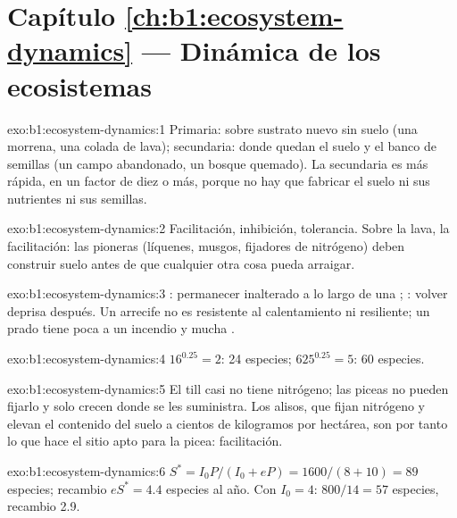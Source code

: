 \section*{Capítulo \ref{ch:b1:ecosystem-dynamics} --- Dinámica de los ecosistemas}

\begin{solution}{exo:b1:ecosystem-dynamics:1}
Primaria: sobre sustrato nuevo sin suelo (una morrena, una colada de lava);
secundaria: donde quedan el suelo y el banco de semillas (un campo
abandonado, un bosque quemado). La secundaria es más rápida, en un factor de
diez o más, porque no hay que fabricar el suelo ni sus nutrientes ni sus
semillas.
\end{solution}

\begin{solution}{exo:b1:ecosystem-dynamics:2}
Facilitación, inhibición, tolerancia. Sobre la lava, la facilitación: las
pioneras (líquenes, musgos, fijadores de nitrógeno) deben construir suelo
antes de que cualquier otra cosa pueda arraigar.
\end{solution}

\begin{solution}{exo:b1:ecosystem-dynamics:3}
: permanecer inalterado a lo largo de una ;
: volver deprisa después. Un arrecife no es resistente al
calentamiento ni resiliente; un prado tiene poca  a un incendio y
mucha .
\end{solution}

\begin{solution}{exo:b1:ecosystem-dynamics:4}
$16^{0.25} = 2$: \num{24} especies; $625^{0.25} = 5$: \num{60} especies.
\end{solution}

\begin{solution}{exo:b1:ecosystem-dynamics:5}
El till casi no tiene nitrógeno; las piceas no pueden fijarlo y solo crecen
donde se les suministra. Los alisos, que fijan nitrógeno y elevan el
contenido del suelo a cientos de kilogramos por hectárea, son por tanto lo
que hace el sitio apto para la picea: facilitación.
\end{solution}

\begin{solution}{exo:b1:ecosystem-dynamics:6}
$S^* = I_0 P/(I_0 + eP) = 1600/(8 + 10) = 89$ especies; recambio
$eS^* = 4.4$ especies al año. Con $I_0 = 4$: $800/14 = 57$ especies,
recambio \num{2.9}.
\end{solution}

